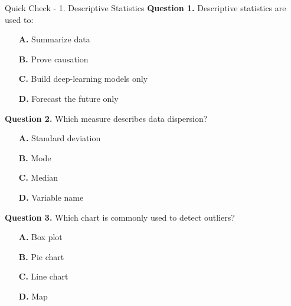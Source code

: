 \documentclass[aspectratio=169,11pt]{beamer}
\begin{document}
\begin{frame}[allowframebreaks]{Quick Check - 1. Descriptive Statistics}
\footnotesize
\textbf{Question 1.} Descriptive statistics are used to:\par\medskip
\begin{itemize}
\item[\textbf{A.}] Summarize data
\item[\textbf{B.}] Prove causation
\item[\textbf{C.}] Build deep-learning models only
\item[\textbf{D.}] Forecast the future only
\end{itemize}
\textbf{Question 2.} Which measure describes data dispersion?\par\medskip
\begin{itemize}
\item[\textbf{A.}] Standard deviation
\item[\textbf{B.}] Mode
\item[\textbf{C.}] Median
\item[\textbf{D.}] Variable name
\end{itemize}
\textbf{Question 3.} Which chart is commonly used to detect outliers?\par\medskip
\begin{itemize}
\item[\textbf{A.}] Box plot
\item[\textbf{B.}] Pie chart
\item[\textbf{C.}] Line chart
\item[\textbf{D.}] Map
\end{itemize}
\end{frame}
\end{document}
